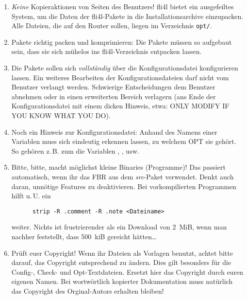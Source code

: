   \begin{enumerate}
    \item \emph{Keine} Kopieraktionen von Seiten des Benutzers! fli4l bietet ein
    ausgefeiltes System, um die Daten der fli4l-Pakete in die
    Installationsarchive einzupacken. Alle Dateien, die auf den Router sollen,
    liegen im Verzeichnis \texttt{opt/}.

    \item Pakete richtig packen und komprimieren: Die Pakete müssen so
    aufgebaut sein, dass sie sich mühelos ins fli4l-Verzeichnis entpacken
    lassen.

    \item Die Pakete sollen sich \emph{vollständig} über die Konfigurationsdatei
    konfigurieren lassen. Ein weiteres Bearbeiten der Konfigurationsdateien
    darf nicht vom Benutzer verlangt werden. Schwierige Entscheidungen dem
    Benutzer abnehmen oder in einen erweiterten Bereich verlagern (ans Ende
    der Konfigurationsdatei mit einem dicken Hinweis, etwa: ONLY MODIFY IF YOU
    KNOW WHAT YOU DO).

    \item Noch ein Hinweis zur Konfigurationsdatei: Anhand des Namens einer
    Variablen muss sich eindeutig erkennen lassen, zu welchem OPT sie gehört.
    So gehören z.\,B. zum  die Variablen ,
    , usw.

    \item Bitte, bitte, macht möglichst kleine Binaries (Programme)! Das
    passiert automatisch, wenn ihr das FBR aus dem \emph{src}-Paket verwendet.
    Denkt auch daran, unnötige Features zu deaktivieren. Bei
    vorkompilierten Programmen hilft u.\,U. ein
\begin{example}
\begin{verbatim}
      strip -R .comment -R .note <Dateiname>
\end{verbatim}
\end{example}
    weiter. Nichts ist frustrierender als ein Download von 2~MiB, wenn man
    nachher feststellt, dass 500~kiB gereicht hätten\ldots


    \item Prüft euer Copyright! Wenn ihr Dateien als Vorlagen benutzt, achtet
    bitte darauf, das Copyright entsprechend zu ändern. Dies gilt besonders
    für die Config-, Check- und Opt-Textdateien. Ersetzt hier das Copyright
    durch euren eigenen Namen. Bei wortwörtlich kopierter Dokumentation muss
    natürlich das Copyright des Orginal-Autors erhalten bleiben!


\end{enumerate}
